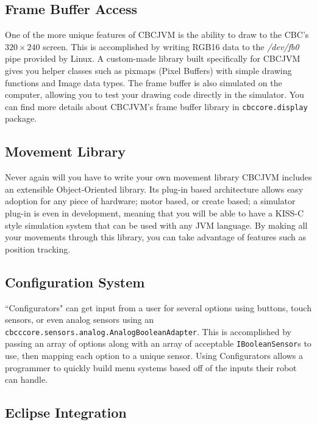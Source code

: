 \documentclass[12pt,letterpaper]{article}
\begin{document}
\subsection{Frame Buffer Access}

One of the more unique features of CBCJVM is the ability to draw to the CBC's $320 \times 240$ screen. This is accomplished by writing RGB16 data to the \textsl{/dev/fb0} pipe provided by Linux. A custom-made library built specifically for CBCJVM gives you helper classes such as pixmaps (Pixel Buffers) with simple drawing functions and Image data types. The frame buffer is also simulated on the computer, allowing you to test your drawing code directly in the simulator. You can find more details about CBCJVM's frame buffer library in \texttt{cbccore.display} package.



\subsection{Movement Library}

Never again will you have to write your own movement library CBCJVM includes an extensible Object-Oriented library. Its plug-in based architecture allows easy adoption for any piece of hardware; motor based, or create based; a simulator plug-in is even in development, meaning that you will be able to have a KISS-C style simulation system that can be used with any JVM language. By making all your movements through this library, you can take advantage of features such as position tracking.



\subsection{Configuration System}

``Configurators" can get input from a user for several options using buttons, touch sensors, or even analog sensors using an \texttt{cbcccore.\-sensors.\-analog.\-AnalogBooleanAdapter}. This is accomplished by passing an array of options along with an array of acceptable \texttt{IBooleanSensor}s to use, then mapping each option to a unique sensor. Using Configurators allows a programmer to quickly build menu systems based off of the inputs their robot can handle.



\subsection{Eclipse Integration}
\end{document}
